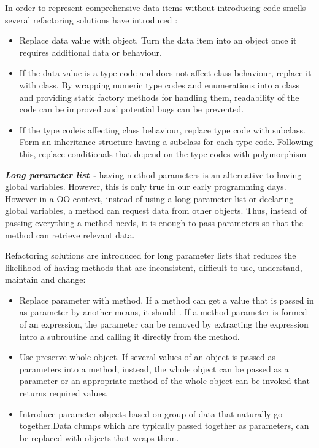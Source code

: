 In order to represent comprehensive data items without introducing code smells several refactoring solutions have introduced \cite{fowlerRefactor}:

\begin{itemize}
\item Replace data value with object. Turn the data item into an object once it requires additional data or behaviour.
\item If the data value is a type code and does not affect class behaviour, replace it with class. By wrapping numeric type codes and enumerations into a class and providing static factory methods for handling them, readability of the code can be improved and potential bugs can be prevented.  
\item If the type codeis affecting class behaviour, replace type code with subclass. Form an inheritance structure having a subclass for each type code. Following this, replace conditionals that depend on the type codes with polymorphism
\end{itemize}

\textit{\textbf{Long parameter list -}} having method parameters is an alternative to having global variables. However, this is only true in our early programming days. However in a \gls{OO} context, instead of using a long parameter list or declaring global variables, a method can request data from other objects. Thus, instead of passing everything a method needs, it is enough to pass parameters so that the method can retrieve relevant data. 

Refactoring solutions are introduced for long parameter lists \cite{fowlerRefactor} that reduces the likelihood of having methods that are inconsistent, difficult to use, understand, maintain and change:

\begin{itemize}
\item Replace parameter with method. If a method can get a value that is passed in as parameter by another means, it should \cite{fowlerRefactor}. If a method parameter is formed of an expression, the parameter can be removed by extracting the expression intro a subroutine and calling it directly from the method. 
\item Use preserve whole object. If several values of an object is passed as parameters into a method, instead, the whole object can be passed as a parameter or an appropriate method of the whole object can be invoked that returns required values.
\item Introduce parameter objects based on group of data that naturally go together.Data clumps which are typically passed together as parameters, can be replaced with objects that wraps them. 
\end{itemize}

